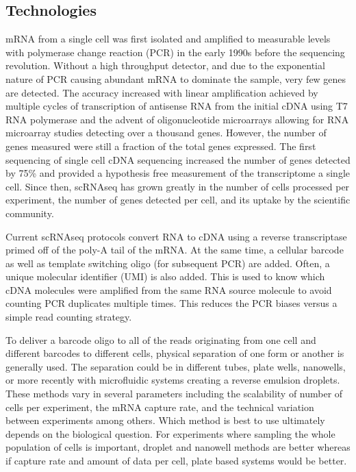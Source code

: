 \subsection{Technologies}

\par{
mRNA from a single cell was first isolated and amplified to measurable levels with polymerase change reaction (PCR)\cite{PCR}\cite{PCRPatent} in the early 1990s\cite{earliersinglecell} before the sequencing revolution. Without a high throughput detector, and due to the exponential nature of PCR causing abundant mRNA to dominate the sample, very few genes are detected. The accuracy increased with linear amplification achieved by multiple cycles of transcription of antisense RNA from the initial cDNA using T7 RNA polymerase\cite{T7amp} and the advent of oligonucleotide microarrays\cite{snpchip} allowing for RNA microarray studies detecting over a thousand genes\cite{microarrayRNA}\cite{microarraySC2}. However, the number of genes measured were still a fraction of the total genes expressed. The first sequencing of single cell cDNA sequencing increased the number of genes detected by 75\%\cite{first_singlecell} and provided a hypothesis free measurement of the transcriptome a single cell. Since then, scRNAseq has grown greatly in the number of cells processed per experiment, the number of genes detected per cell, and its uptake by the scientific community\cite{singlecellgrowth}.
}

\par{
Current scRNAseq protocols convert RNA to cDNA using a reverse transcriptase primed off of the poly-A tail of the mRNA. At the same time, a cellular barcode as well as template switching oligo (for subsequent PCR) are added. Often, a unique molecular identifier (UMI) is also added. This is used to know which cDNA molecules were amplified from the same RNA source molecule to avoid counting PCR duplicates multiple times\cite{UMI1}\cite{UMI2}. This reduces the PCR biases versus a simple read counting strategy. 
} 

\par{
To deliver a barcode oligo to all of the reads originating from one cell and different barcodes to different cells, physical separation of one form or another is generally used. The separation could be in different tubes, plate wells, nanowells\cite{seqwell}\cite{scalablemicro}\cite{combilabel}, or more recently with microfluidic systems creating a reverse emulsion droplets\cite{dropseq}\cite{Klein2015}\cite{10xsinglecell}. These methods vary in several parameters including the scalability of number of cells per experiment, the mRNA capture rate, and the technical variation between experiments among others\cite{powersingle}\cite{singlecompare}\cite{singlecompare2}. Which method is best to use ultimately depends on the biological question. For experiments where sampling the whole population of cells is important, droplet and nanowell methods are better whereas if capture rate and amount of data per cell, plate based systems would be better. 
}


